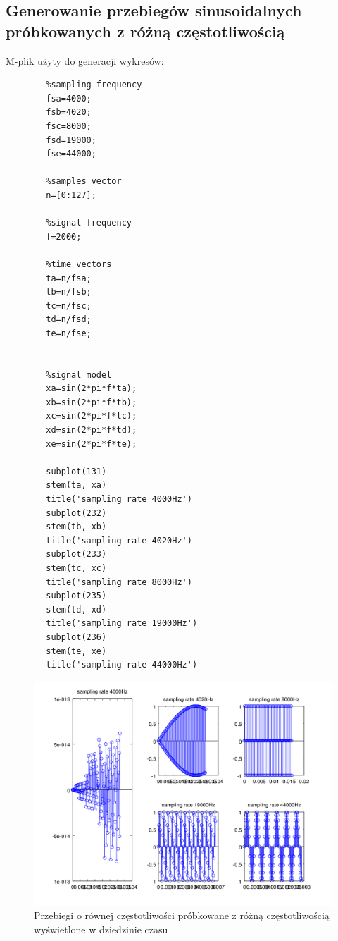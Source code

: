 \documentclass[12pt,titlepage]{report}
\begin{document}
\subsection{Generowanie przebiegów sinusoidalnych próbkowanych z różną częstotliwością}
M-plik użyty do generacji wykresów:
\begin{multicols}{3}
	{
		\tiny
		\begin{verbatim}
		%sampling frequency
		fsa=4000;
		fsb=4020;
		fsc=8000;
		fsd=19000;
		fse=44000;
		
		%samples vector
		n=[0:127];
		
		%signal frequency
		f=2000;
		
		%time vectors
		ta=n/fsa;
		tb=n/fsb;
		tc=n/fsc;
		td=n/fsd;
		te=n/fse;
		
		
		%signal model
		xa=sin(2*pi*f*ta);
		xb=sin(2*pi*f*tb);
		xc=sin(2*pi*f*tc);
		xd=sin(2*pi*f*td);
		xe=sin(2*pi*f*te);
		
		subplot(131)
		stem(ta, xa)
		title('sampling rate 4000Hz')
		subplot(232)
		stem(tb, xb)
		title('sampling rate 4020Hz')
		subplot(233)
		stem(tc, xc)
		title('sampling rate 8000Hz')
		subplot(235)
		stem(td, xd)
		title('sampling rate 19000Hz')
		subplot(236)
		stem(te, xe)
		title('sampling rate 44000Hz')
		\end{verbatim}
	}
\end{multicols}
\begin{figure}[!h]
	\centering
	\includegraphics[scale=0.7]{../cw12_output}
	\caption{Przebiegi o równej częstotliwości próbkowane z różną częstotliwością wyświetlone w dziedzinie czasu}
\end{figure}
\newpage
\end{document}
